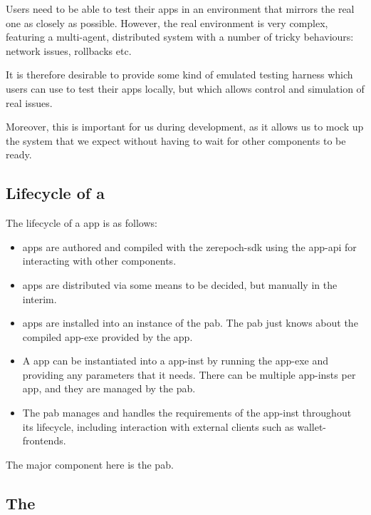 \begin{requirement}
\label{req:app-emulation}
Users need to be able to test their \glspl{app} in an environment that mirrors the real one as closely as possible.
However, the real environment is very complex, featuring a multi-agent, distributed system with a number of tricky behaviours: network issues, rollbacks etc.

It is therefore desirable to provide some kind of emulated testing harness which users can use to test their \glspl{app} locally, but which allows control and simulation of real issues.

Moreover, this is important for us during development, as it allows us to mock up the system that we expect without having to wait for other components to be ready.
\end{requirement}

\subsection{Lifecycle of a }

The lifecycle of a \gls{app} is as follows:

\begin{itemize}
\item
  \Glspl{app} are authored and compiled with the \gls{zerepoch-sdk} using the \gls{app-api} for interacting with other components.
\item
  \Glspl{app} are distributed via some means to be decided, but manually in the interim.
\item
  \Glspl{app} are installed into an instance of the \gls{pab}. The \gls{pab} just knows about the compiled \gls{app-exe} provided by the \gls{app}.
\item
  A \gls{app} can be instantiated into a \gls{app-inst} by running the \gls{app-exe} and providing any parameters that it needs.
  There can be multiple \glspl{app-inst} per \gls{app}, and they are managed by the \gls{pab}.
\item
  The \gls{pab} manages and handles the requirements of the \gls{app-inst} throughout its lifecycle, including interaction with external clients such as \glspl{wallet-frontend}.
\end{itemize}

The major component here is the \gls{pab}.

\subsection{The }
\label{sec:pab}

